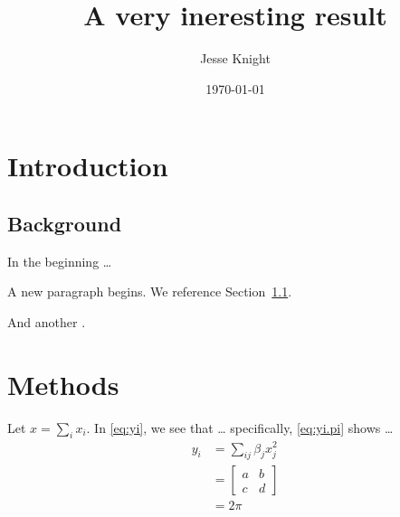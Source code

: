\documentclass[12pt]{article}
\title{A very ineresting result}
\author[1,2]{Jesse Knight}
\affil[1]{Main Institution}
\affil[2]{Another Institution}
\date{\today}
\begin{document}
  \maketitle %
  \section{Introduction}\label{intro}
  \subsection{Background}\label{intro.back}
  In the beginning \dots %
  \par
  A new paragraph begins. %
  We reference Section~\ref{intro.back}. %
  \par
  And another \cite{Last2023}. %
  \section{Methods}\label{meth}
  Let $x = \sum_i x_i$. %
  In \eqref{eq:yi}, we see that \dots %
  specifically, \eqref{eq:yi.pi} shows \dots\ %
  \begin{subequations} %
    \label{eq:yi} %
    \begin{align} %
      y_i &= \sum_{ij} \beta_j x^2_j \\ %
          &= \left[ \begin{matrix} a & b \\ c & d \end{matrix} \right] \\ %
          &= 2 \pi \label{eq:yi.pi}%
    \end{align}
  \end{subequations}
\end{document}
